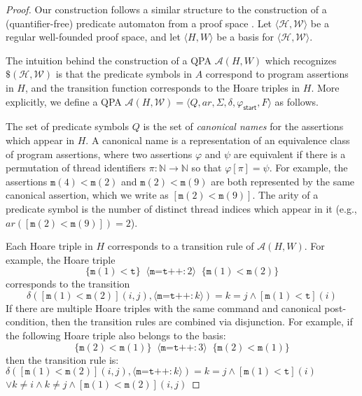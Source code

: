 \documentclass[9pt,nocopyrightspace]{sigplanconf}
\theoremstyle{definition}
\newcommand{\tuple}[1]{\langle #1 \rangle}
\newcommand{\hoare}[3]{\{{#1}\}\;\;#2\;\;\{{#3}\}}
\newcommand{\rankformulas}{\mathscr{W}}
\newcommand{\ic}[2]{{\tuple{#1 : #2}}}
\newcommand{\start}{\mathsf{start}}
\renewcommand{\phi}{\varphi}
\newcommand{\ar}{\textit{ar}}
\begin{document}
\proppaproof*
\begin{proof}
  Our construction follows a similar structure to the construction of a
  (quantifier-free) predicate automaton from a proof space \cite{Farzan2015}.
  Let $\tuple{\mathscr{H},\rankformulas}$ be a regular well-founded proof space, and let $\tuple{H,W}$ be a basis for $\tuple{\mathscr{H},\rankformulas}$.

  The intuition behind the construction of a QPA $\mathcal{A}(H,W)$ which
  recognizes $\$(\mathscr{H},\rankformulas)$ is that the predicate symbols in $A$
  correspond to program assertions in $H$, and the transition function
  corresponds to the Hoare triples in $H$.  More explicitly, we define a QPA
  $\mathcal{A}(H,\rankformulas) = \tuple{Q,\ar,\Sigma,\delta,\phi_\start,F}$ as follows.

  The set of predicate symbols $Q$ is the set of \emph{canonical names} for
  the assertions which appear in $H$.  A canonical name is a representation of
  an equivalence class of program assertions, where two assertions $\phi$ and
  $\psi$ are equivalent if there is a permutation of thread identifiers $\pi :
  \mathbb{N} \rightarrow \mathbb{N}$ so that $\phi[\pi] = \psi$.  For example,
  the assertions $\texttt{m}(4)<\texttt{m}(2)$ and
  $\texttt{m}(2)<\texttt{m}(9)$ are both represented by the same canonical
  assertion, which we write as $[\texttt{m}(2)<\texttt{m}(9)]$.  The arity of
  a predicate symbol is the number of distinct thread indices which appear in it
  (e.g., $\ar([\texttt{m}(2)<\texttt{m}(9)]) = 2$).

  Each Hoare triple in $H$ corresponds to a transition rule of
  $\mathcal{A}(H,W)$.  For example, the Hoare triple
  \[\hoare{\texttt{m}(1)<\texttt{t}}{\ic{\texttt{m=t++}}{2}}{\texttt{m}(1)<\texttt{m}(2)}\]
  corresponds to the transition
  \[\delta([\texttt{m}(1)<\texttt{m}(2)](i,j), \ic{\texttt{m=t++}}{k}) = k = j \land [\texttt{m}(1)<\texttt{t}](i) \]
  If there are multiple Hoare triples with the same command and canonical
  post-condition, then the transition rules are combined via disjunction.  For
  example, if the following Hoare triple also belongs to the basis:
  \[\hoare{\texttt{m}(2)<\texttt{m}(1)}{\ic{\texttt{m=t++}}{3}}{\texttt{m}(2)<\texttt{m}(1)}\]
  then the transition rule is:\\
  $\delta([\texttt{m}(1)<\texttt{m}(2)](i,j), \ic{\texttt{m=t++}}{k}) = k = j \land [\texttt{m}(1)<\texttt{t}](i)$\\
  \null\hfill$\lor k \neq i \land k \neq j \land [\texttt{m}(1)<\texttt{m}(2)](i,j)$


\end{proof}
\end{document}
